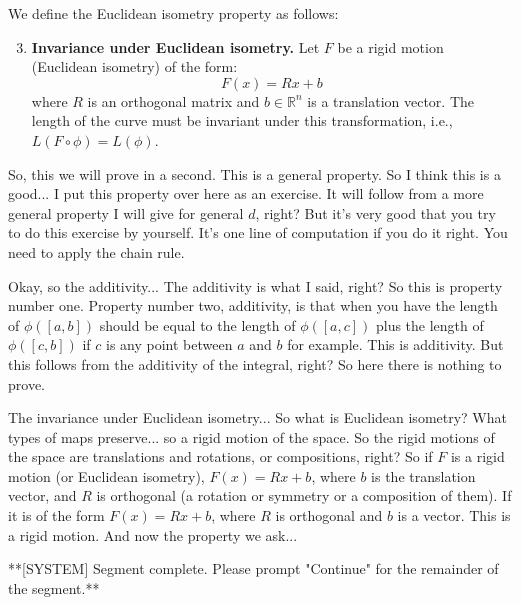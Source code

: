 \begin{math_stroke}
We define the Euclidean isometry property as follows:
\begin{enumerate}
    \setcounter{enumi}{2}
    \item \textbf{Invariance under Euclidean isometry.} Let $F$ be a rigid motion (Euclidean isometry) of the form:
    \[
    F(x) = Rx + b
    \]
    where $R$ is an orthogonal matrix and $b \in \mathbb{R}^n$ is a translation vector. The length of the curve must be invariant under this transformation, i.e., $L(F \circ \phi) = L(\phi)$.
\end{enumerate}
\end{math_stroke}

\begin{spoken_clean}[00:17:49 - 00:20:15]
So, this we will prove in a second. This is a general property. So I think this is a good... I put this property over here as an exercise. It will follow from a more general property I will give for general $d$, right? But it's very good that you try to do this exercise by yourself. It's one line of computation if you do it right. You need to apply the chain rule.

Okay, so the additivity... The additivity is what I said, right? So this is property number one. Property number two, additivity, is that when you have the length of $\phi([a,b])$ should be equal to the length of $\phi([a,c])$ plus the length of $\phi([c,b])$ if $c$ is any point between $a$ and $b$ for example. This is additivity. But this follows from the additivity of the integral, right? So here there is nothing to prove.

The invariance under Euclidean isometry... So what is Euclidean isometry? What types of maps preserve... so a rigid motion of the space. So the rigid motions of the space are translations and rotations, or compositions, right? So if $F$ is a rigid motion (or Euclidean isometry), $F(x) = Rx + b$, where $b$ is the translation vector, and $R$ is orthogonal (a rotation or symmetry or a composition of them). If it is of the form $F(x) = Rx + b$, where $R$ is orthogonal and $b$ is a vector. This is a rigid motion. And now the property we ask...
\end{spoken_clean}

**[SYSTEM] Segment complete. Please prompt "Continue" for the remainder of the segment.**
